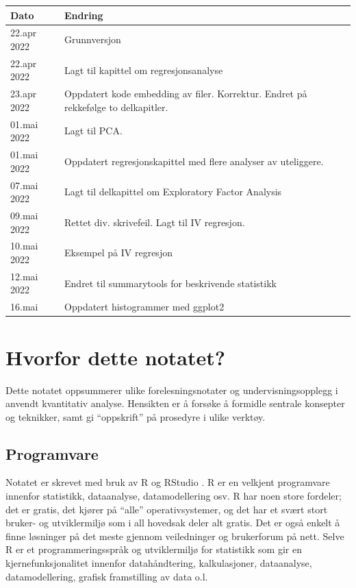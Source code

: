 \documentclass[
]{article}
\begin{document}
\begin{table}
\centering\begingroup\fontsize{12}{14}\selectfont

\begin{tabular}[t]{>{\raggedright\arraybackslash}p{8em}|>{\raggedright\arraybackslash}p{40em}}
\hline
Dato & Endring\\
\hline
22.apr 2022 & Grunnversjon\\
\hline
22.apr 2022 & Lagt til kapittel om regresjonsanalyse\\
\hline
23.apr 2022 & Oppdatert kode embedding av filer. Korrektur. Endret på rekkefølge to delkapitler.\\
\hline
01.mai 2022 & Lagt til PCA.\\
\hline
01.mai 2022 & Oppdatert regresjonskapittel med flere analyser av uteliggere.\\
\hline
07.mai 2022 & Lagt til delkapittel om Exploratory Factor Analysis\\
\hline
09.mai 2022 & Rettet div. skrivefeil. Lagt til IV regresjon.\\
\hline
10.mai 2022 & Eksempel på IV regresjon\\
\hline
12.mai 2022 & Endret til summarytools for beskrivende statistikk\\
\hline
16.mai & Oppdatert histogrammer med ggplot2\\
\hline
\end{tabular}
\endgroup{}
\end{table}

\hypertarget{hvorfor-dette-notatet}{%
\section*{Hvorfor dette notatet?}\label{hvorfor-dette-notatet}}

Dette notatet oppsummerer ulike forelesningsnotater og undervisningsopplegg i anvendt kvantitativ analyse. Hensikten er å forsøke å formidle sentrale konsepter og teknikker, samt gi ``oppskrift'' på prosedyre i ulike verktøy.

\hypertarget{programvare}{%
\subsection*{Programvare}\label{programvare}}

Notatet er skrevet med bruk av R \citep{rcoreteamLanguageEnvironmentStatistical2021} og RStudio \citep{rstudioteamRStudioIntegratedDevelopment2022}. R er en velkjent programvare innenfor statistikk, dataanalyse, datamodellering osv. R har noen store fordeler; det er gratis, det kjører på ``alle'' operativsystemer, og det har et svært stort bruker- og utviklermiljø som i all hovedsak deler alt gratis. Det er også enkelt å finne løsninger på det meste gjennom veiledninger og brukerforum på nett. Selve R er et programmeringsspråk og utviklermiljø for statistikk som gir en kjernefunksjonalitet innenfor datahåndtering, kalkulasjoner, dataanalyse, datamodellering, grafisk framstilling av data o.l.
\end{document}
